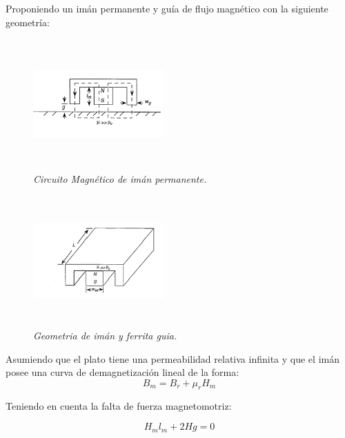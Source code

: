 Proponiendo un imán permanente y guía de flujo magnético con la siguiente geometría:
\begin{figure}[htb]
\begin{center}
\centering
	
	\includegraphics[width=5cm, height=5cm]{images/Capitulo_1/Circuito_magnetico_de_iman_permanente}
	\caption{\textit{Circuito Magnético de imán permanente.}}
	\label{fig:system:example1}	
\end{center}
\end{figure}

\begin{figure}[htb]
\begin{center}
\centering
	\includegraphics[width=5cm, height=5cm]{images/Capitulo_1/Geometria_de_iman_y_ferrita_guia}
	\caption{\textit{Geometria de imán y ferrita guia.}}
	\label{fig:system:example1}	
\end{center}
\end{figure}

Asumiendo que el plato tiene una permeabilidad relativa infinita y que el imán posee una curva de demagnetización lineal de la forma:
\begin{equation}
	B_m = B_r + \mu_rH_m
\end{equation}

Teniendo en cuenta la falta de fuerza magnetomotriz:

\begin{equation}
	H_m l_m +2Hg = 0 
\end{equation}

